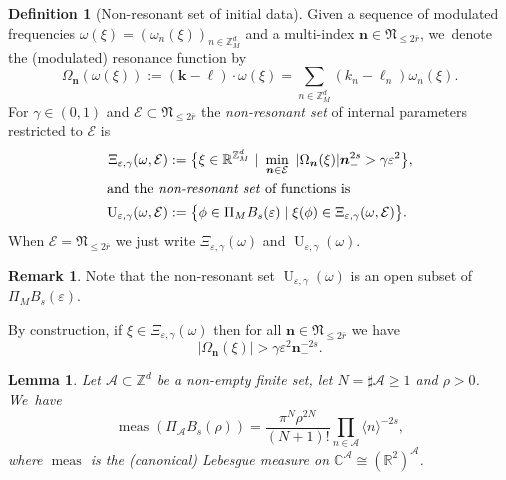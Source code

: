 \documentclass[JEP,XML,SOM,Unicode,published]{cedram}
\theoremstyle{plain}
\newtheorem{lemma}[theorem]{Lemma}
\theoremstyle{definition}
\newtheorem{definition}[theorem]{Definition}
\newtheorem{remark}[theorem]{Remark}
\DeclareMathOperator{\meas}{meas}
\newcommand{\nb}{{\boldsymbol n}}
\newcommand{\kb}{{\boldsymbol k}}
\newcommand{\lb}{{\boldsymbol \ell}}
\newcommand{\Nb}{{\boldsymbol{\mathfrak{N}}}}
\newcommand{\Z}{\mathbb{Z}}
\newcommand{\R}{\mathbb{R}}
\newcommand{\C}{\mathbb{C}}
\newcommand{\1}{\mathbf{1}}
\let\epsilon\varepsilon
\begin{document}
\begin{definition}[Non-resonant set of initial data]
\label{def:non-res}Given a sequence of modulated frequencies $\omega(\xi)=(\omega_n(\xi))_{n\in\Z_{M}^{d}}$
and a multi-index $\nb\in\Nb_{\leq2\overline{r}}$, we~denote the (modulated) resonance function by
\[
\Omega_\nb(\omega(\xi)) := (\kb-\lb)\cdot\omega(\xi) = \sum_{n\in\Z_{M}^{d}}(k_n- \ell_n)\omega_n(\xi).
\]
For $\gamma\in(0,1)$ and $\mathcal{E}\subset \Nb_{\leq2\overline{r}}$ the \emph{non-resonant set} of internal parameters restricted to $\mathcal{E}$ is
\begin{align}
\label{eq:gmdst}
\Xi_{\epsilon,\gamma}(\omega,\mathcal{E})
&:= \big\{\xi\in \R^{\Z_{M}^{d}}\
|\ \min_{\nb\in\mathcal{E}}\ |\Omega_\nb(\xi)|
\nb_-^{2s}>\gamma\epsilon^2\big\},\\
\intertext{and the \emph{non-resonant set} of functions is}
\label{eq:theta-set}
\operatorname{U}_{\epsilon,\gamma}(\omega,\mathcal{E})&:=\big\{\phi\in\Pi_{M}B_{s}(\epsilon)\mid \xi(\phi)\in\Xi_{\epsilon,\gamma}(\omega,\mathcal{E})\big\}.
\end{align}
When $\mathcal{E}=\Nb_{\leq2\overline{r}}$ we just write $\Xi_{\epsilon,\gamma}(\omega)$ and $\operatorname{U}_{\epsilon,\gamma}(\omega)$.
\end{definition}
\begin{remark}
Note that the non-resonant set $\operatorname{U}_{\epsilon,\gamma}(\omega)$ is an open subset of $\Pi_{M}B_{s}(\epsilon)$.
\end{remark}
By construction, if $\xi\in\Xi_{\epsilon,\gamma}(\omega)$ then for all $\nb\in\Nb_{\leq2\overline{r}}$ we have
\[
|\Omega_{\nb}(\xi)| >\gamma\epsilon^2\nb_{-}^{-2s}.
\]

\begin{lemma}\label{lem:meas-ball} Let $\mathcal{A}\subset{\Z}^{d}$ be a non-empty finite set, let $N=\sharp\mathcal{A}\geq1$ and $\rho>0$. We~have
\[
\meas(\Pi_{\mathcal{A}}B_{s}(\rho)) = \frac{\pi^{N}\rho^{2N}}{(N+1)!}\prod_{n\in\mathcal{A}}\langle n\rangle^{-2s},
\]
where $\meas$ is the (canonical) Lebesgue measure on $\C^{\mathcal{A}}\cong (\R^{2})^{\mathcal{A}} $.
\end{lemma}
\end{document}
